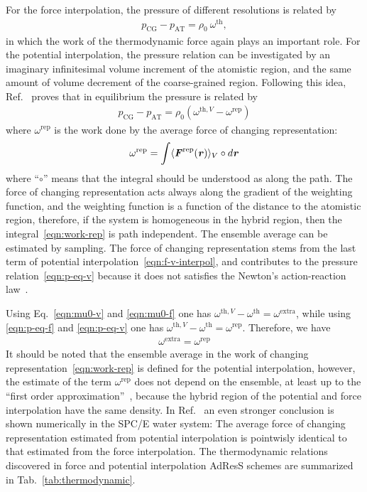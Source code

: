 \documentclass[epjST]{svjour}
\newcommand{\vect}[1]{\textbf{\textit{#1}}}
\newcommand{\AT}[0]{\textrm{AT}}
\newcommand{\CG}[0]{\textrm{CG}}
\newcommand{\thf}{{\textrm{th}}}
\newcommand{\rep}{{\textrm{rep}}}
\newcommand{\exc}{{\textrm{extra}}}
\begin{document}
For the force interpolation, the pressure of different resolutions
is related by~\cite{fritsch2012adaptive}
\begin{align}\label{eqn:p-eq-f}
  p_\CG - p_\AT = \rho_0 \:\omega^{\thf},
\end{align}
in which the work of the thermodynamic force again plays an important
role.  For the potential interpolation, the pressure relation can be
investigated by an imaginary infinitesimal volume increment of the atomistic
region, and the same amount of volume decrement of the coarse-grained
region. Following this idea, Ref.~\cite{agarwal2014chemical} proves that in
equilibrium the pressure is related by
\begin{align}\label{eqn:p-eq-v}
  p_\CG - p_\AT = \rho_0 (\omega^{\thf,V} - \omega^\rep)  
\end{align}
where $\omega^\rep$ is the work done by the average force of changing representation:
\begin{align}\label{eqn:work-rep}
  \omega^\rep = \int \langle \vect F^\rep(\vect r)\rangle_V\circ d\vect r
\end{align}
where ``$\circ$'' means that the integral should be understood as along the path.
The force of changing representation acts always along the gradient of the weighting
function, and the weighting function is a function of the distance to the atomistic region,
therefore, if the system is homogeneous in the hybrid region, then the integral~\eqref{eqn:work-rep}
is path independent. The ensemble average  can be estimated by sampling.
The force of changing representation stems from the last term of potential
interpolation~\eqref{eqn:f-v-interpol}, and contributes to the
pressure relation~\eqref{eqn:p-eq-v} because it does not satisfies the Newton's action-reaction
law~\cite{agarwal2014chemical}.

Using Eq.~\eqref{eqn:mu0-v} and \eqref{eqn:mu0-f} one has $\omega^{\thf,V} - \omega^\thf = \omega^\exc$,
while using \eqref{eqn:p-eq-f} and \eqref{eqn:p-eq-v} one has $\omega^{\thf,V} - \omega^\thf = \omega^\rep$.
Therefore, we have 
\begin{align}
  \omega^\exc = \omega^\rep
\end{align}
It should be noted that the ensemble average in the work
of changing representation~\eqref{eqn:work-rep} is defined for the
potential interpolation, however, the estimate of the term
$\omega^\rep$ does not depend on the ensemble, at least up to the
``first order approximation''~\cite{agarwal2014chemical}, because the
hybrid region of the potential and force interpolation have the same
density. In Ref.~\cite{wang2013grand} an even stronger conclusion is shown numerically in the SPC/E water system: The
average force of changing representation estimated from potential
interpolation is pointwisly identical to that estimated from the force
interpolation. The thermodynamic relations discovered in
force and potential interpolation AdResS schemes are summarized
in Tab.~\ref{tab:thermodynamic}.
\end{document}
